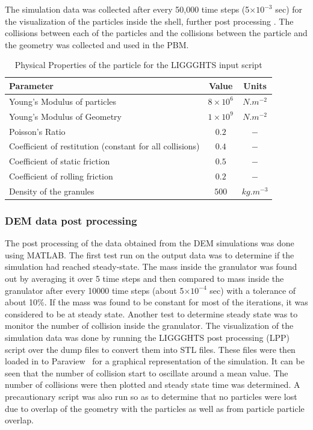 \documentclass[preprint,11pt,authoryear]{elsarticle}
\begin{document}
The simulation data was collected after every 50,000 time steps (5$\times 10^{-3}$ sec) 
for the visualization of the particles inside the shell, further post processing . The collisions 
between each of the particles and the collisions between the particle and the geometry was 
collected and used in the PBM. 

\begin{table}
\caption{Physical Properties of the particle for the LIGGGHTS input script} 
\label{table:mthds_dem_input}
\begin{center}
\begin{tabular}{l|c|c}
\hline
\bf{Parameter} &\bf{Value} &\bf{Units}\\
\hline
Young's Modulus of particles  & $8 \times 10^{6}$ & $N.m^{-2}$\\
Young's Modulus of Geometry  & $1 \times 10^{9}$ & $N.m^{-2}$\\
Poisson's Ratio & $0.2$ & $-$\\
Coefficient of restitution (constant for all collisions) & $0.4$ & $-$\\
Coefficient of static friction & $0.5$ & $-$\\
Coefficient of rolling friction  & $0.2$ & $-$\\
Density of the granules & $500$ & $kg.m^{-3}$\\
\hline
\end{tabular}
\end{center}
\end{table}

\subsubsection{DEM data post processing}
The post processing of the data obtained from the DEM simulations was done using MATLAB. 
The first test run on the output data was to determine if the simulation had reached steady-state. The 
mass inside the granulator was found out by averaging it over 5 time steps and then compared to 
mass inside the granulator after every 10000 time steps (about 5$\times 10^{-4}$ sec) with a 
tolerance of about 10\%. If the mass was found to be constant for most of the iterations, it was 
considered to be at steady state. Another test to determine steady state was to monitor the number of 
collision inside the granulator. The visualization of the simulation data was done by running the 
LIGGGHTS post processing (LPP) script over the dump files to convert them into STL files. These 
files were then loaded in to Paraview~\citep{paraview2017} for a graphical 
representation of the 
simulation. It can be seen that the number of collision start to oscillate around a mean value. The 
number of collisions were then plotted and steady state time was determined.
A precautionary script was also run so as to determine that no particles were lost due to overlap 
of the geometry with the particles as well as from particle particle overlap.
\end{document}
